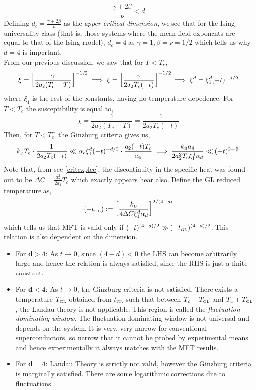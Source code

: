 \begin{equation}
    \frac{\gamma+2\beta}{\nu}<d
\end{equation}
Defining $d_c = \frac{\gamma+2\beta}{\nu}$ as the \textit{upper critical dimension}, we see that for the Ising universality class (that is, those systems where the mean-field exponents are equal to that of the Ising model), $d_c = 4$ as $\gamma=1, \beta=\nu = 1/2$ which tells us why $d=4$ is important.\\[0.2cm]
From our previous discussion, we saw that for $T<T_c$, 
$$\xi =\qty[\frac{\gamma}{2a_2(T_c-T)}]^{-1/2} \implies \xi =\qty[\frac{\gamma}{2a_2T_c (-t)}]^{-1/2}\implies \xi^d = \xi^d_1 (-t)^{-d/2}$$
where $\xi_1$ is the rest of the constants, having no temperature depedence. For $T<T_c$ the susceptibility is equal to,
$$\chi = \frac{1}{2a_2(T_c-T)} = \frac{1}{2a_2 T_c(-t)}$$
Then, for $T<T_c^-$ the Ginzburg criteria gives us,
\begin{align*}
    k_{\text{\tiny B}} T_c\cdot \frac{1}{2a_2T_c (-t)}\ll \alpha_d \xi^d_1 (-t)^{-d/2}\cdot \frac{a_2(-t)T_c}{a_4}\implies 
    \frac{k_{\text{\tiny B}} a_4}{2a_2^2 T_c \xi_1^d \alpha_d}\ll (-t)^{2-\frac{d}{2}}
\end{align*}
Note that, from sec \ref{critexplec}, the discontinuity in the specific heat was found out to be $\Delta C  = \frac{a_2^2}{2a_4}T_c$ which exactly appears hear also. Define the GL reduced temperature as, 
\begin{equation}
    (-t_{\text{\tiny GL}}):= \qty[\frac{k_{\text{\tiny B}} }{4\Delta C \xi_1^d \alpha_d}]^{2/(4-d)}
\end{equation}
which tells us that MFT is valid only if $(-t)^{(4-d)/2}\gg (-t_{\text{\tiny GL}})^{(4-d)/2}$. This relation is also dependent on the dimension. 
\begin{itemize}
    \item For $\mathbf{d>4}$: As $t\to 0$, since $(4-d)<0$ the LHS can become arbitrarily large and hence the relation is always satisfied, since the RHS is just a finite constant. 
    \item For $\mathbf{d<4}$: As $t\to 0$, the Ginzburg criteria is not satisfied. There exists a temperature $T_{\text{\tiny GL}}$ obtained from $t_{\text{\tiny GL}}$ such that between $T_c - T_{\text{\tiny GL}}$ and $T_c+T_{\text{\tiny GL}}$, the Landau theory is not applicable. This region is called the \textit{fluctuation dominating window}. The fluctuation dominating window is not universal and depends on the system. It is very, very narrow for conventional superconductors, so narrow that it cannot be probed by experimental means and hence experimentally it always matches with the MFT results.
    \item For $\mathbf{d=4}$: Landau Theory is strictly not valid, however the Ginzburg criteria is marginally satisfied. There are some logarithmic corrections due to fluctuations. 
\end{itemize}
